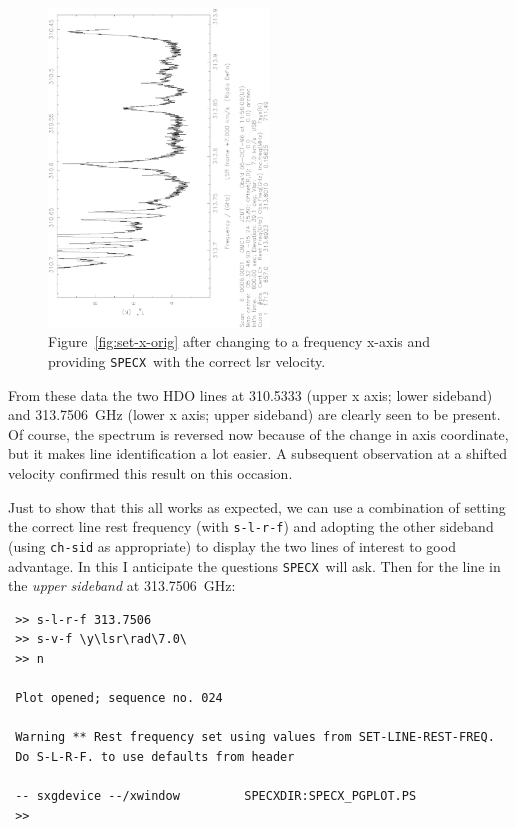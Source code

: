 \documentclass[11pt,twoside]{article}
\newcommand{\SPECX}{{\tt SPECX}}
\begin{document}
\begin{figure}[ht]
\begin{minipage}[t]{\textwidth}
\begin{minipage}[b]{0.5\textwidth}
\includegraphics[angle=-90,width=2.3in]{sc8_hdo_freq.ps}
\centering
\end{minipage}
\hfill
\begin{minipage}[b]{0.45\textwidth}
\caption[A messy spectrum with reasonable axes]
{\small{Figure~\ref{fig:set-x-orig} after changing to a frequency
x-axis and providing \SPECX\ with the correct lsr velocity.
\vspace*{1cm}
}}
\label{fig:set-x-to-freq}
\end{minipage}
\end{minipage}
\end{figure}

From these data the two HDO lines at 310.5333 (upper x axis; lower
sideband) and 313.7506~GHz (lower x axis; upper sideband) are clearly
seen to be present. Of course, the spectrum is reversed now because of
the change in axis coordinate, but it makes line identification a lot
easier. A subsequent observation at a shifted velocity confirmed this
result on this occasion.

Just to show that this all works as expected, we can use a combination
of setting the correct line rest frequency (with {\tt s-l-r-f}) and
adopting the other sideband (using {\tt ch-sid} as appropriate) to display
the two
lines of interest to good advantage. In this I anticipate the
questions \SPECX\ will ask. Then for the line in the {\it upper sideband}
at
313.7506~GHz:
\begin{verbatim}
 >> s-l-r-f 313.7506
 >> s-v-f \y\lsr\rad\7.0\
 >> n

 Plot opened; sequence no. 024

 Warning ** Rest frequency set using values from SET-LINE-REST-FREQ.
 Do S-L-R-F. to use defaults from header

 -- sxgdevice --/xwindow         SPECXDIR:SPECX_PGPLOT.PS
 >>
\end{verbatim}
\end{document}
